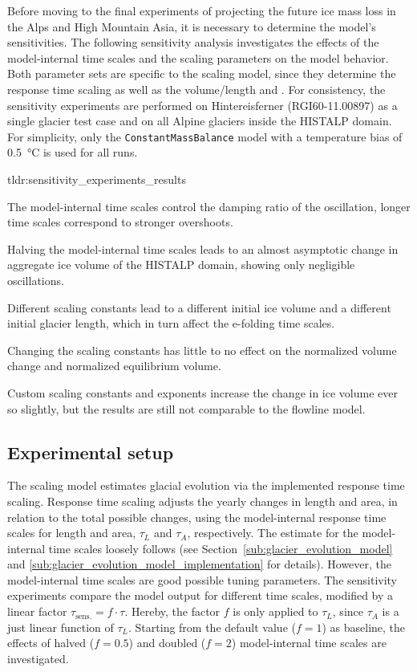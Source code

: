     Before moving to the final experiments of projecting the future ice mass loss in the Alps and High Mountain Asia, it is necessary to determine the model's sensitivities. The following sensitivity analysis investigates the effects of the model-internal time scales and the scaling parameters on the model behavior. Both parameter sets are specific to the scaling model, since they determine the response time scaling as well as the volume/length and \vas{}. For consistency, the sensitivity experiments are performed on Hintereisferner (RGI60-11.00897) as a single glacier test case and on all Alpine glaciers inside the HISTALP domain. For simplicity, only the \lstinline`ConstantMassBalance` model with a temperature bias of \SI{+0.5}{\celsius} is used for all runs.

    \begin{tldrbox}{tldr:sensitivity_experiments_results}
      \item The model-internal time scales control the damping ratio of the oscillation, longer time scales correspond to stronger overshoots.
      \item Halving the model-internal time scales leads to an almost asymptotic change in aggregate ice volume of the HISTALP domain, showing only negligible oscillations.
      \item Different scaling constants lead to a different initial ice volume and a different initial glacier length, which in turn affect the e-folding time scales.
      \item Changing the scaling constants has little to no effect on the normalized volume change and normalized equilibrium volume.
      \item Custom scaling constants and exponents increase the change in ice volume ever so slightly, but the results are still not comparable to the flowline model.
    \end{tldrbox}

    \subsection{Experimental setup} %
    \label{sub:experimental_setup_sensitivity}

        The scaling model estimates glacial evolution via the implemented response time scaling. Response time scaling adjusts the yearly changes in length and area, in relation to the total possible changes, using the model-internal response time scales for length and area, $\tau_L$ and  $\tau_A$, respectively.
        The estimate for the model-internal time scales loosely follows \citet{Johannesson1989} (see Section~\ref{sub:glacier_evolution_model} and \ref{sub:glacier_evolution_model_implementation} for details). However, the model-internal time scales are good possible tuning parameters. The sensitivity experiments compare the model output for different time scales, modified by a linear factor $\tau_\text{sens.} = f \cdot \tau$. Hereby, the factor $f$ is only applied to $\tau_L$, since $\tau_A$ is a just linear function of $\tau_L$. Starting from the default value ($f=1$) as baseline, the effects of halved ($f=0.5$) and doubled ($f=2$) model-internal time scales are investigated.

